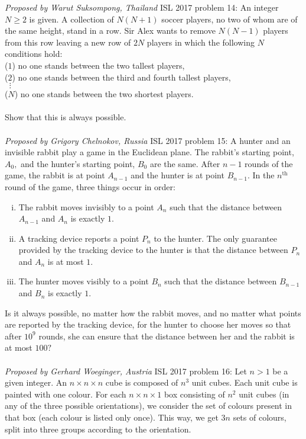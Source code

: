 \textit{Proposed by Warut Suksompong, Thailand} 
ISL 2017 problem 14:  An integer $N \ge 2$ is given. A collection of $N(N + 1)$ soccer players, no two of whom are of the same height, stand in a row. Sir Alex wants to remove $N(N - 1)$ players from this row leaving a new row of $2N$ players in which the following $N$ conditions hold: \\
($1$) no one stands between the two tallest players, \\
($2$) no one stands between the third and fourth tallest players, \\
$\;\;\vdots$ \\
($N$) no one stands between the two shortest players. \\\\
Show that this is always possible. \\\\
\textit{Proposed by Grigory Chelnokov, Russia} 
ISL 2017 problem 15:  A hunter and an invisible rabbit play a game in the Euclidean plane. The rabbit's starting point, $A_0,$ and the hunter's starting point, $B_0$ are the same. After $n-1$ rounds of the game, the rabbit is at point $A_{n-1}$ and the hunter is at point $B_{n-1}.$ In the $n^{\text{th}}$ round of the game, three things occur in order:
\begin{enumerate}[i.]
  \item The rabbit moves invisibly to a point $A_n$ such that the distance between $A_{n-1}$ and $A_n$ is exactly $1.$

  \item A tracking device reports a point $P_n$ to the hunter. The only guarantee provided by the tracking device to the hunter is that the distance between $P_n$ and $A_n$ is at most $1.$

  \item The hunter moves visibly to a point $B_n$ such that the distance between $B_{n-1}$ and $B_n$ is exactly $1.$
\end{enumerate}
Is it always possible, no matter how the rabbit moves, and no matter what points are reported by the tracking device, for the hunter to choose her moves so that after $10^9$ rounds, she can ensure that the distance between her and the rabbit is at most $100?$ \\\\
\textit{Proposed by Gerhard Woeginger, Austria} 
ISL 2017 problem 16:  Let $n > 1$ be a given integer. An $n \times n \times n$ cube is composed of $n^3$ unit cubes. Each unit cube is painted with one colour. For each $n \times n \times 1$ box consisting of $n^2$ unit cubes (in any of the three possible orientations), we consider the set of colours present in that box (each colour is listed only once). This way, we get $3n$ sets of colours, split into three groups according to the orientation. \\\\
